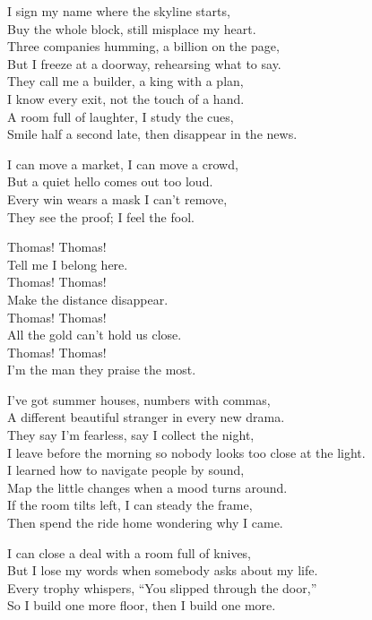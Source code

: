 \begin{lyrics}
I sign my name where the skyline starts,\\
Buy the whole block, still misplace my heart.\\
Three companies humming, a billion on the page,\\
But I freeze at a doorway, rehearsing what to say.\\
They call me a builder, a king with a plan,\\
I know every exit, not the touch of a hand.\\
A room full of laughter, I study the cues,\\
Smile half a second late, then disappear in the news.

I can move a market, I can move a crowd,\\
But a quiet hello comes out too loud.\\
Every win wears a mask I can’t remove,\\
They see the proof; I feel the fool.

Thomas! Thomas!\\
Tell me I belong here.\\
Thomas! Thomas!\\
Make the distance disappear.\\
Thomas! Thomas!\\
All the gold can’t hold us close.\\
Thomas! Thomas!\\
I’m the man they praise the most.

I’ve got summer houses, numbers with commas,\\
A different beautiful stranger in every new drama.\\
They say I’m fearless, say I collect the night,\\
I leave before the morning so nobody looks too close at the light.\\
I learned how to navigate people by sound,\\
Map the little changes when a mood turns around.\\
If the room tilts left, I can steady the frame,\\
Then spend the ride home wondering why I came.

I can close a deal with a room full of knives,\\
But I lose my words when somebody asks about my life.\\
Every trophy whispers, “You slipped through the door,”\\
So I build one more floor, then I build one more.


\end{lyrics}
